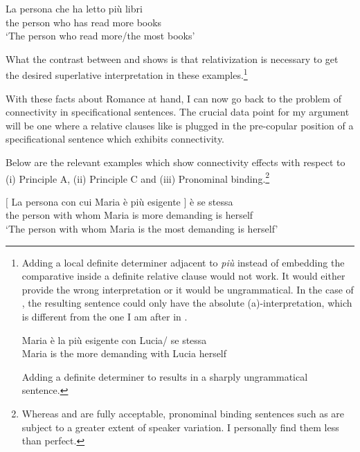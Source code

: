 \documentclass[output=paper,colorlinks,citecolor=brown,draft,draftmode]{langscibook}
\begin{document}
\ea
\gll La persona che ha letto più libri\\
the person who has read   more books\\
\glt `The person who read more/the most books'
\z

What the contrast between  and  shows is that relativization is necessary to get the desired superlative interpretation in these examples.\footnote{Adding
  a local definite determiner adjacent to \textit{più} instead of embedding the comparative inside a definite relative clause would not work. It would either provide the wrong interpretation or it would be ungrammatical. In the case of , the resulting sentence could only have the absolute (a)-interpretation, which is different from the one I am after in .

  \ea
  \gll \label{sententiallevel2}Maria è la più esigente con Lucia/ {se stessa}\\
  Maria is the more demanding with Lucia herself\\
  \z
  \z

  Adding a definite determiner to  results in a sharply ungrammatical sentence.

  \z
}


With these facts about Romance at hand, I can now go back to the problem of connectivity in specificational sentences.
The crucial data point for my argument will be one where  a relative clauses like  is plugged in the pre-copular position of a specificational sentence which exhibits connectivity.


Below are the relevant examples which show connectivity effects with respect to  (i) Principle A, (ii) Principle C and (iii) Pronominal binding.\footnote{Whereas  and  are fully acceptable, pronominal binding sentences such as  are subject to a greater extent of speaker variation. I personally find them less than perfect.}



\ea
\gll \label{lapersona}$[$ La persona con cui  Maria è più esigente $]$ è {se stessa} \\
{} the person with whom Maria is more demanding {} is herself\\
\glt `The person with whom Maria is the most demanding is herself'
\z
\end{document}
